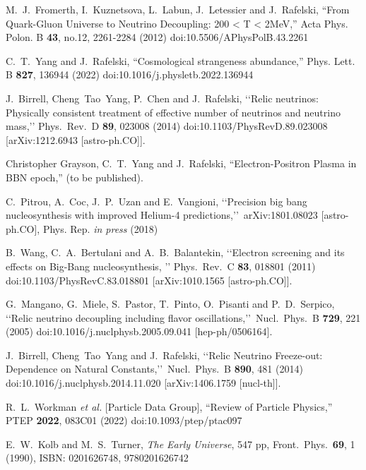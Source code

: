 \documentclass[Universe,article,submit,moreauthors,pdftex]{Definitions/mdpi}
\begin{document}
\begin{thebibliography}{99}

M.~J.~Fromerth, I.~Kuznetsova, L.~Labun, J.~Letessier and J.~Rafelski,
``From Quark-Gluon Universe to Neutrino Decoupling: 200 < T < 2MeV,''
Acta Phys. Polon. B \textbf{43}, no.12, 2261-2284 (2012)
doi:10.5506/APhysPolB.43.2261

C.~T.~Yang and J.~Rafelski,
``Cosmological strangeness abundance,''
Phys. Lett. B \textbf{827}, 136944 (2022)
doi:10.1016/j.physletb.2022.136944

J.~Birrell, Cheng~Tao~Yang, P.~Chen and J.~Rafelski,
\lq\lq Relic neutrinos: Physically consistent treatment of effective number of neutrinos and neutrino mass,\rq\rq
Phys.\ Rev.\ D {\bf 89}, 023008 (2014)
doi:10.1103/PhysRevD.89.023008
[arXiv:1212.6943 [astro-ph.CO]].

Christopher Grayson, C.~T.~Yang and J.~Rafelski,
``Electron-Positron Plasma in BBN epoch,'' (to be published).

C.~Pitrou, A.~Coc, J.~P.~Uzan and E.~Vangioni,
\lq\lq Precision big bang nucleosynthesis with improved Helium-4 predictions,\rq\rq\ 
arXiv:1801.08023 [astro-ph.CO], Phys. Rep. {\it in press} (2018)


B.~Wang, C.~A.~Bertulani and A.~B.~Balantekin,
\lq\lq Electron screening and its effects on Big-Bang nucleosynthesis, \rq\rq
Phys.\ Rev.\ C {\bf 83}, 018801 (2011)
doi:10.1103/PhysRevC.83.018801
[arXiv:1010.1565 [astro-ph.CO]].

G.~Mangano, G.~Miele, S.~Pastor, T.~Pinto, O.~Pisanti and P.~D.~Serpico,
\lq\lq Relic neutrino decoupling including flavor oscillations,\rq\rq\
Nucl.\ Phys.\ B {\bf 729}, 221 (2005)
doi:10.1016/j.nuclphysb.2005.09.041
[hep-ph/0506164].

 J.~Birrell, Cheng~Tao~Yang and J.~Rafelski,
\lq\lq Relic Neutrino Freeze-out: Dependence on Natural Constants,\rq\rq\
 Nucl.\ Phys.\ B {\bf 890}, 481 (2014)
 doi:10.1016/j.nuclphysb.2014.11.020
 [arXiv:1406.1759 [nucl-th]].


R.~L.~Workman \textit{et al.} [Particle Data Group],
``Review of Particle Physics,''
PTEP \textbf{2022}, 083C01 (2022)
doi:10.1093/ptep/ptac097

E.~W.~Kolb and M.~S.~Turner,
\emph{The Early Universe},
547 pp, Front.\ Phys.\ {\bf 69}, 1 (1990),
ISBN: 0201626748, 9780201626742


 


\end{thebibliography}

\end{document}
